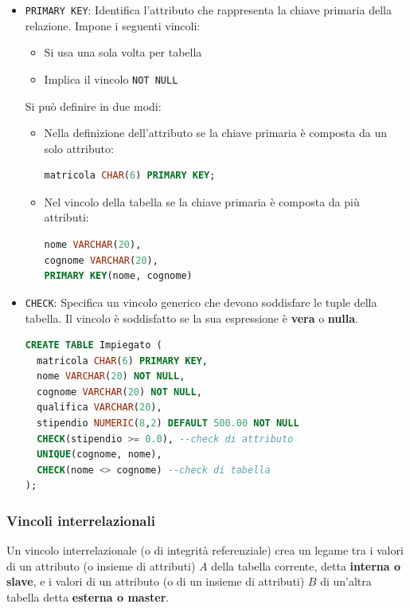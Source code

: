 \documentclass[a4paper,twoside]{article}
\begin{document}
\begin{itemize}
  \item \texttt{PRIMARY KEY}: Identifica l'attributo che rappresenta la chiave primaria
    della relazione. Impone i seguenti vincoli:
    \begin{itemize}
      \item Si usa una sola volta per tabella
      \item Implica il vincolo \texttt{NOT NULL}
    \end{itemize}
    Si può definire in due modi:
    \begin{itemize}
      \item Nella definizione dell'attributo se la chiave primaria è composta da un
        solo attributo:
\begin{lstlisting}[language=SQL, numbers=none]
matricola CHAR(6) PRIMARY KEY;
\end{lstlisting}

      \item Nel vincolo della tabella se la chiave primaria è composta da più attributi:
\begin{lstlisting}[language=SQL]
nome VARCHAR(20),
cognome VARCHAR(20),
PRIMARY KEY(nome, cognome)
\end{lstlisting}
    \end{itemize}

  \item \texttt{CHECK}: Specifica un vincolo generico che devono soddisfare le tuple
    della tabella. Il vincolo è soddisfatto se la sua espressione è \textbf{vera}
    o \textbf{nulla}.

\begin{lstlisting}[language=SQL, numbers=none]
CREATE TABLE Impiegato (
  matricola CHAR(6) PRIMARY KEY,
  nome VARCHAR(20) NOT NULL,
  cognome VARCHAR(20) NOT NULL,
  qualifica VARCHAR(20),
  stipendio NUMERIC(8,2) DEFAULT 500.00 NOT NULL
  CHECK(stipendio >= 0.0), --check di attributo
  UNIQUE(cognome, nome),
  CHECK(nome <> cognome) --check di tabella
);
\end{lstlisting}
\end{itemize}

\subsubsection{Vincoli interrelazionali}
Un vincolo interrelazionale (o di integrità referenziale) crea un legame tra i valori
di un attributo (o insieme di attributi) \( A \) della tabella corrente, detta
\textbf{interna o slave}, e i valori di un attributo (o di un insieme di attributi)
\( B \) di un'altra tabella detta \textbf{esterna o master}.
\end{document}
